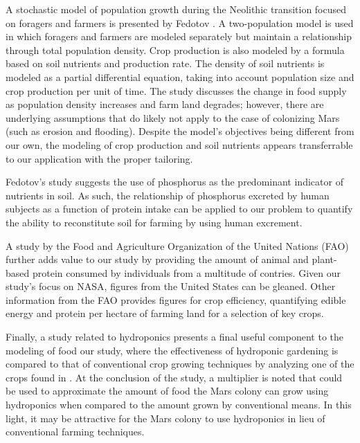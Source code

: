\documentclass[12pt]{article}
\begin{document}
A stochastic model of population growth	during the Neolithic transition focused
on foragers and farmers is presented by Fedotov \cite{fedotov2008stochastic}. A
two-population model is used in which foragers and farmers are modeled
separately but maintain a relationship through total population density.
Crop production is also modeled by a formula based on soil nutrients and
production rate. The density of soil nutrients is modeled as a partial
differential equation, taking into account population size and crop production
per unit of time. The study discusses the change in food supply as population
density increases and farm land degrades; however, there are underlying
assumptions that do likely not apply to the case of colonizing Mars (such as
erosion and flooding). Despite the model's objectives being different from our
own, the modeling of crop production and soil nutrients appears transferrable
to our application with the proper tailoring.

Fedotov's study \cite{fedotov2008stochastic} suggests the use of phosphorus as
the predominant indicator of nutrients in soil. As such, the relationship of
phosphorus excreted by human subjects as a function of protein intake
\cite{pooOnYOu} can be applied to our problem to quantify the ability to
reconstitute soil for farming by using human excrement.

A study by the Food and Agriculture Organization of the United Nations (FAO)
\cite{faoProtein} further adds value to our study by providing the
amount of animal and plant-based protein consumed by individuals from a
multitude of contries. Given our study's focus on NASA, figures from the United
States can be gleaned. Other information from the FAO \cite{faoNutrition}
provides figures for crop efficiency, quantifying edible energy
and protein per hectare of farming land for a selection of key crops.

Finally, a study related to hydroponics \cite{iHeartHydroponics} presents a
final useful component to the modeling of food our study, where the
effectiveness of hydroponic gardening is compared to that of conventional crop
growing techniques by analyzing one of the crops found in \cite{faoNutrition}.
At the conclusion of the study, a multiplier is noted that could be used to
approximate the amount of food the Mars colony can grow using hydroponics when
compared to the amount grown by conventional means. In this light, it may be
attractive for the Mars colony to use hydroponics in lieu of conventional
farming techniques.
\end{document}
